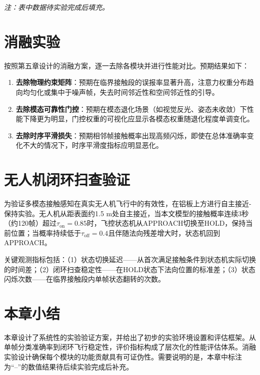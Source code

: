 \textit{注：表中数据待实验完成后填充。}

\section{消融实验}

按照第五章设计的消融方案，逐一去除各模块并进行性能对比。预期结果如下：

\begin{enumerate}
\item \textbf{去除物理约束矩阵}：预期在临界接触段的误报率显著升高，注意力权重分布趋向均匀化或集中于噪声帧，失去时间邻近性和空间邻近性的引导。
\item \textbf{去除模态可靠性门控}：预期在模态退化场景（如视觉反光、姿态未收敛）下性能下降更为明显，门控权重的可视化应显示各模态权重随退化程度单调变化。
\item \textbf{去除时序平滑损失}：预期相邻帧接触概率出现高频闪烁，即使在总体准确率变化不大的情况下，时序平滑度指标应明显恶化。
\end{enumerate}

\section{无人机闭环扫查验证}

为验证多模态接触感知在真实无人机飞行中的有效性，在铝板上方进行自主接近-保持实验。无人机从距表面约1.5 m处自主接近，当本文模型的接触概率连续3秒（约120帧）超过$\tau_{\text{on}} = 0.85$时，飞控状态机从APPROACH切换至HOLD，保持当前位置；当概率持续低于$\tau_{\text{off}} = 0.4$且伴随法向残差增大时，状态机回到APPROACH。

关键观测指标包括：（1）状态切换延迟——从首次满足接触条件到状态机实际切换的时间差；（2）闭环扫查稳定性——在HOLD状态下法向位置的标准差；（3）状态闪烁次数——在临界接触段内单帧状态翻转的次数。

\section{本章小结}

本章设计了系统性的实验验证方案，并给出了初步的实验环境设置和评估框架。从单帧分类准确率到闭环飞行稳定性，评价指标构成了层次化的性能评估体系。消融实验设计确保每个模块的功能贡献具有可证伪性。需要说明的是，本章中标注为“--”的数值结果待后续实验完成后补充。

